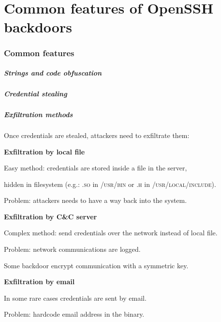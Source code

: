 \part{Common features of OpenSSH backdoors}
\section{Common features}

\begin{frame}
	\partpage
\end{frame}

\begin{frame}
	\frametitle{Strings and code obfuscation}
\end{frame}


\begin{frame}
	\frametitle{Credential stealing}
	
\end{frame}


\begin{frame}
	\frametitle{Exfiltration methods}
	
	Once credentials are stealed, attackers need to exfiltrate them:
	
	\bigskip

	\textbf{Exfiltration by local file}
	
	\smallskip
	
	Easy method: credentials are stored inside a file in the server,
	
	hidden in filesystem (e.g.: \textsc{.so} in \textsc{/usr/bin} or \textsc{.h} in \textsc{/usr/local/include}).
	
	Problem: attackers needs to have a way back into the system.
	
	\bigskip

	\textbf{Exfiltration by C\&C server}
	
	\smallskip
	
	Complex method: send credentials over the network instead of local file.
	
	Problem: network communications are logged.
	
	Some backdoor encrypt communication with a symmetric key.
	
	\bigskip

	\textbf{Exfiltration by email}

	\smallskip
	
	In some rare cases credentials are sent by email.
	
	Problem: hardcode email address in the binary.
	
	\bigskip
	
	
\end{frame}


